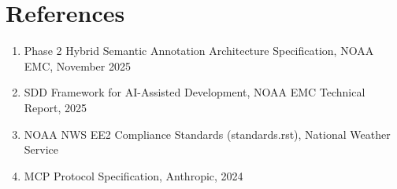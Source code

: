 \documentclass[11pt,a4paper]{article}
\begin{document}
\section*{References}

\begin{enumerate}
    \item Phase 2 Hybrid Semantic Annotation Architecture Specification, NOAA EMC, November 2025
    \item SDD Framework for AI-Assisted Development, NOAA EMC Technical Report, 2025
    \item NOAA NWS EE2 Compliance Standards (standards.rst), National Weather Service
    \item MCP Protocol Specification, Anthropic, 2024
\end{enumerate}
\end{document}
